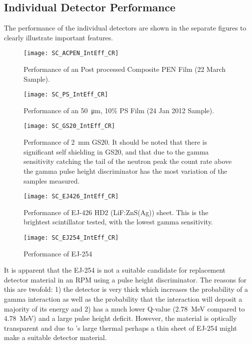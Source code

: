 \subsection{Individual Detector Performance}
The performance of the individual detectors are shown in the separate figures to clearly illustrate important features.
\begin{figure}
  \centering
  \texttt{[image: SC\_ACPEN\_IntEff\_CR]}
  \caption[Post processed Composite PEN Performance]{Performance of an Post processed Composite PEN Film (22 March Sample).}
  \label{fig:ACPENPreformance}
\end{figure}
\begin{figure}
  \centering
  \texttt{[image: SC\_PS\_IntEff\_CR]}
  \caption[Cast Polystyrene Performance]{Performance of an \SI{50}{\um}, 10\%  PS Film (24 Jan 2012 Sample).}
  \label{fig:PSPreformance}
\end{figure}
\begin{figure}
  \centering
  \texttt{[image: SC\_GS20\_IntEff\_CR]}
  \caption[GS20 Performance]{Performance of \SI{2}{\mm} GS20.  It should be noted that there is significant self shielding in GS20, and that due to the gamma sensitivity catching the tail of the neutron peak the count rate above the gamma pulse height discriminator has the most variation of the samples measured.}
  \label{fig:GS20Preformance}
\end{figure}
\begin{figure}
  \centering
  \texttt{[image: SC\_EJ426\_IntEff\_CR]}
  \caption[EJ 426 Performance]{Performance of EJ-426 HD2 (LiF:ZnS(Ag)) sheet.  This is the brightest scintillator tested, with the lowest gamma sensitivity.}
  \label{fig:EJ254Perf}
\end{figure}
\begin{figure}
  \centering
  \texttt{[image: SC\_EJ254\_IntEff\_CR]}
  \caption[EJ 254 Performance]{Performance of EJ-254}
  \label{fig:EJ254Preformance}
\end{figure}
It is apparent that the EJ-254 is not a suitable candidate for replacement detector material in an RPM using a pulse height discriminator.
The reasons for this are twofold: 1) the detector is very thick which increases the probability of a gamma interaction as well as the probability that the interaction will deposit a majority of its energy and 2)  has a much lower Q-value (\SI{2.78}{\MeV} compared to \SI{4.78}{\MeV}) and a large pulse height deficit.
However, the material is optically transparent and due to 's large thermal perhaps a thin sheet of EJ-254 might make a suitable detector material.
